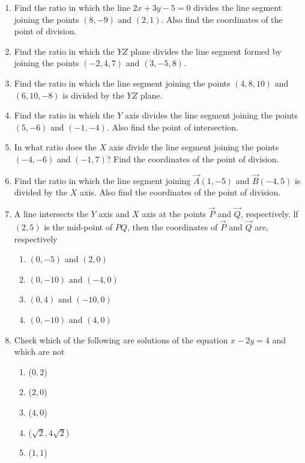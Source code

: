 \begin{enumerate}[label=\thesubsection.\arabic*, ref=\thesubsection.\theenumi]
\item Find the ratio in which the line $2x+3y-5=0$ divides the line segment joining the points $(8,-9)$ and $(2,1)$. Also find the coordinates of the point of division.
\item Find the ratio in which the $YZ$ plane divides the line segment formed by joining the points $(-2,4,7)$ and $(3,-5,8)$.
\item Find the ratio in which the line segment joining the points $(4,8,10)$ and $(6,10,-8)$ is divided by the $YZ$ plane.
\item Find the ratio in which the $Y$ axis divides the line segment joining the points $(5,-6)$ and $(-1,-4)$. Also find the point of intersection.
\item In what ratio does the $X$ axis divide the line segment joining the points $(-4,-6)$ and $(-1,7)$? Find the coordinates of the point of division.
\item Find the ratio in which the line segment joining $\vec{A}(1,-5)$  and  $\vec{B}(-4,5)$ is divided by the $X$ axis. Also find the coordinates of the point of division.
\item A line intersects the $Y$ axis and $X$ axis at the points $\vec{P}$  and $\vec{Q}$,  respectively. lf $(2, 5)$ is the mid-point of $PQ$,  then the coordinates of $\vec{P}$ and $ \vec{Q}$ are,  respectively
\begin{enumerate}
	\item$(0,-5)$ and $(2,0)$
	\item$(0,-10)$ and $(-4,0)$
	\item$(0,4)$ and  $(-10,0)$
	\item$(0,-10)$ and $(4,0)$
\end{enumerate}
\item Check which of the following are solutions of the equation $x-2y=4$ and which 
are not
\begin{enumerate}
\item ($0, 2$)
\item ($2, 0$)
\item ($4, 0$)
\item ($\sqrt 2,  4\sqrt 2$)
\item ($1, 1$)
\end{enumerate}

\end{enumerate}
